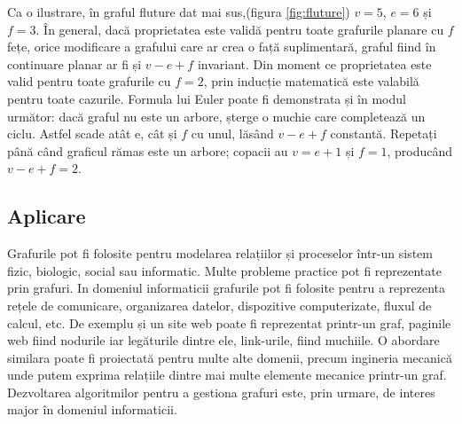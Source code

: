 
Ca o ilustrare, în graful fluture dat mai sus,(figura \ref{fig:fluture}) \(v = 5\), \(e = 6\) și \(f = 3\). În general, dacă proprietatea este validă 
pentru toate grafurile planare cu \(f\) fețe, orice modificare a grafului care ar crea o față suplimentară, graful 
fiind în continuare planar ar fi și \(v - e + f\) invariant. Din moment ce proprietatea este valid pentru toate grafurile 
cu \(f = 2\), prin inducție matematică este valabilă pentru toate cazurile. Formula lui Euler poate fi demonstrata și în 
modul următor: dacă graful nu este un arbore, șterge o muchie care completează un ciclu. Astfel scade atât e, cât și 
\(f\) cu unul, lăsând \(v - e + f\) constantă. Repetați până când graficul rămas este un arbore; copacii au \(v = e + 1\) și \(f = 1\), 
producând \(v - e + f = 2\).\newline

\subsection{Aplicare}

Grafurile pot fi folosite pentru modelarea relațiilor și proceselor într-un sistem fizic, biologic, 
social sau informatic. Multe probleme practice pot fi reprezentate prin grafuri. In domeniul informaticii 
grafurile pot fi folosite pentru a reprezenta rețele de comunicare, organizarea datelor, dispozitive computerizate, 
fluxul de calcul, etc. De exemplu și un site web poate fi reprezentat printr-un graf, paginile web fiind nodurile 
iar legăturile dintre ele, link-urile, fiind muchiile. O abordare similara poate fi proiectată pentru multe alte domenii, 
precum ingineria mecanică unde putem exprima relațiile dintre mai multe elemente mecanice printr-un graf. Dezvoltarea 
algoritmilor pentru a gestiona grafuri este, prin urmare, de interes major în domeniul informaticii.










